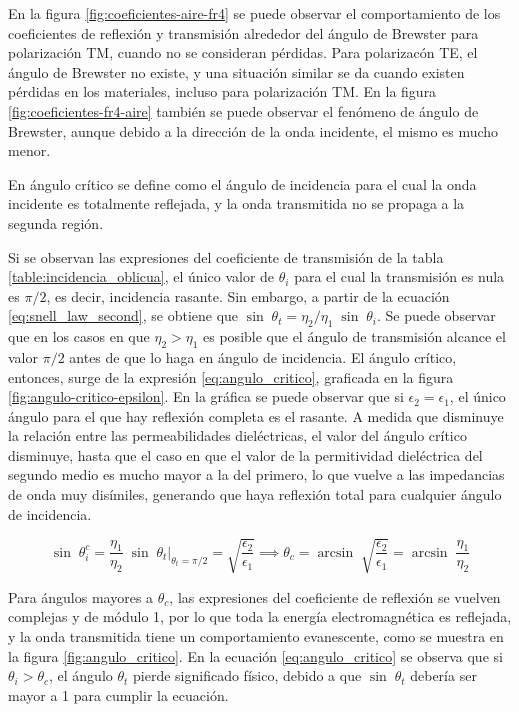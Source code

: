En la figura  \ref{fig:coeficientes-aire-fr4} se puede observar el comportamiento de los coeficientes de reflexión y transmisión alrededor del ángulo de Brewster para polarización TM, cuando no se consideran pérdidas. Para polarizacón TE, el ángulo de Brewster no existe, y una situación similar se da cuando existen pérdidas en los materiales, incluso para polarización TM. En la figura \ref{fig:coeficientes-fr4-aire} también se puede observar el fenómeno de ángulo de Brewster, aunque debido a la dirección de la onda incidente, el mismo es mucho menor.


En ángulo crítico se define como el ángulo de incidencia para el cual la onda incidente es totalmente reflejada, y la onda transmitida no se propaga a la segunda región.

Si se observan las expresiones del coeficiente de transmisión de la tabla \ref{table:incidencia_oblicua}, el único valor de $\theta_i$ para el cual la transmisión es nula es $\pi/2$, es decir, incidencia rasante. Sin embargo, a partir de la ecuación \ref{eq:snell_law_second}, se obtiene que $\sin \; \theta_t = \eta_2 / \eta_1\; \sin\; \theta_i$. Se puede observar que en los casos en que $\eta_2 > \eta_1$ es posible que el ángulo de transmisión alcance el valor $\pi/2$ antes de que lo haga en ángulo de incidencia. El ángulo crítico, entonces, surge de la expresión \ref{eq:angulo_critico}, graficada en la figura \ref{fig:angulo-critico-epsilon}. En la gráfica se puede observar que si $\epsilon_2 = \epsilon_1$, el único ángulo para el que hay reflexión completa es el rasante. A medida que disminuye la relación entre las permeabilidades dieléctricas, el valor del ángulo crítico disminuye, hasta que el caso en que el valor de la permitividad dieléctrica del segundo medio es mucho mayor a la del primero, lo que vuelve a las impedancias de onda muy disímiles, generando que haya reflexión total para cualquier ángulo de incidencia.

\begin{equation}
	\label{eq:angulo_critico}
	\sin\; \theta_i^c = \frac{\eta_1}{\eta_2}\;\sin \; \theta_t|_{\theta_t=\pi/2} = \sqrt{\frac{\epsilon_2}{\epsilon_1}} \implies \theta_c = \arcsin \;\sqrt{\frac{\epsilon_2}{\epsilon_1}} = \arcsin \;\frac{\eta_1}{\eta_2}
\end{equation}

Para ángulos mayores a $\theta_c$, las expresiones del coeficiente de reflexión se vuelven complejas y de módulo 1, por lo que toda la energía electromagnética es reflejada, y la onda transmitida tiene un comportamiento evanescente, como se muestra en la figura \ref{fig:angulo_critico}. En la ecuación \ref{eq:angulo_critico} se observa que si $\theta_i > \theta_c$, el ángulo $\theta_t$ pierde significado físico, debido a que $\sin\; \theta_t$ debería ser mayor a 1 para cumplir la ecuación.

